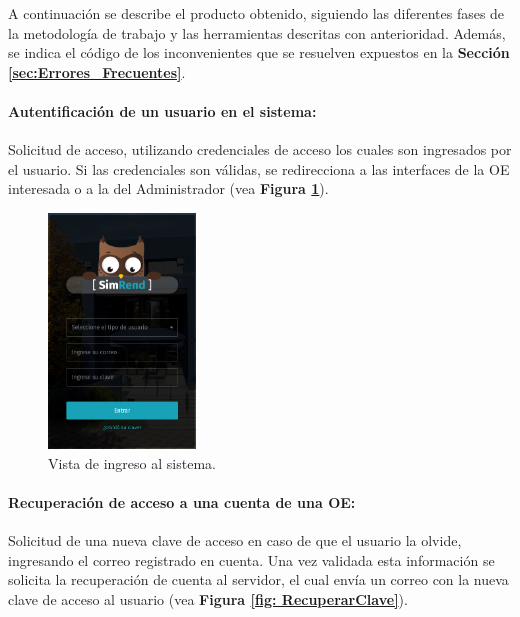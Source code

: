 A continuación se describe el producto obtenido, siguiendo las diferentes fases de la metodología de trabajo y las herramientas descritas con anterioridad. Además, se indica el código de los inconvenientes que se resuelven expuestos en la \textbf{Sección \ref{sec:Errores_Frecuentes}}.

\paragraph{Autentificación de un usuario en el sistema: } Solicitud de acceso, utilizando credenciales de acceso los cuales son ingresados por el usuario. Si las credenciales son válidas, se redirecciona a las interfaces de la OE interesada o a la del Administrador (vea \textbf{Figura \ref{fig: Login}}).

\begin{figure}[htbp]
    \centering
    \includegraphics[width=0.35\textwidth]{Imagenes/Login.PNG}
    \caption{\label{fig: Login}Vista de ingreso al sistema.}
\end{figure}

\paragraph{Recuperación de acceso a una cuenta de una OE: } Solicitud de una nueva clave de acceso en caso de que el usuario la olvide, ingresando el correo registrado en cuenta. Una vez validada esta información se solicita la recuperación de cuenta al servidor, el cual envía un correo con la nueva clave de acceso al usuario (vea \textbf{Figura \ref{fig: RecuperarClave}}).


